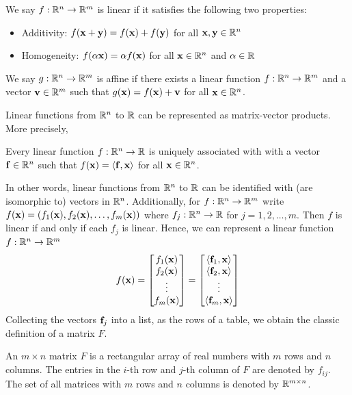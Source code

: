 \begin{definition}
We say $f: \mathbb{R}^n \to \mathbb{R}^m$ is linear if it satisfies the following two properties:
\begin{itemize}
    \item Additivity: $f(\mathbf{x} + \mathbf{y}) = f(\mathbf{x}) + f(\mathbf{y})$ for all $\mathbf{x}, \mathbf{y} \in \mathbb{R}^n$
    \item Homogeneity: $f(\alpha \mathbf{x}) = \alpha f(\mathbf{x})$ for all $\mathbf{x} \in \mathbb{R}^n$ and $\alpha \in \mathbb{R}$
\end{itemize}
We say $g: \mathbb{R}^n \to \mathbb{R}^m$ is affine if there exists a linear function $f: \mathbb{R}^n \to \mathbb{R}^m$ and a vector $\mathbf{v} \in \mathbb{R}^m$ such that $g(\mathbf{x}) = f(\mathbf{x}) + \mathbf{v}$ for all $\mathbf{x} \in \mathbb{R}^n$.
\end{definition}

Linear functions from $\mathbb{R}^n$ to $\mathbb{R}$ can be represented as matrix-vector products. More precisely, 
\begin{lemma}
Every linear function $f: \mathbb{R}^n \to \mathbb{R}$ is uniquely associated with 
   with a vector $\mathbf{f} \in \mathbb{R}^n$ such that $f(\mathbf{x}) = \langle \mathbf{f}, \mathbf{x} \rangle$ for all $\mathbf{x} \in \mathbb{R}^n$. 
\end{lemma}
In other words, linear functions from $\mathbb{R}^n$ to $\mathbb{R}$ can be identified with (are isomorphic to) vectors in $\mathbb{R}^n$. Additionally, for $f: \mathbb{R}^n \to \mathbb{R}^m$ write $f(\mathbf{x}) = (f_1(\mathbf{x}), f_2(\mathbf{x}), \ldots, f_m(\mathbf{x}))$ where $f_j: \mathbb{R}^n \to \mathbb{R}$ for $j=1,2,\ldots,m$. Then $f$ is linear if and only if each $f_j$ is linear. Hence, we can represent a linear function $f: \mathbb{R}^n \to \mathbb{R}^m$ 
\begin{equation*}
    f(\mathbf{x}) = \begin{bmatrix}
        f_1(\mathbf{x}) \\
        f_2(\mathbf{x}) \\
        \vdots \\
        f_m(\mathbf{x})
    \end{bmatrix} = 
    \begin{bmatrix}
        \langle \mathbf{f}_1, \mathbf{x} \rangle \\
        \langle \mathbf{f}_2, \mathbf{x} \rangle \\
        \vdots \\
        \langle \mathbf{f}_m, \mathbf{x} \rangle
    \end{bmatrix} 
\end{equation*}
Collecting the vectors $\mathbf{f}_j$ into a list, as the rows of a table, we obtain 
the classic definition of a matrix $F$. 
\begin{definition}
    An $m \times n$ matrix $F$ is a rectangular array of real numbers with $m$ rows and $n$ columns. The entries in the $i$-th row and $j$-th column of $F$ are denoted by $f_{ij}$. The set of all matrices with $m$ rows and $n$ columns is denoted by $\mathbb{R}^{m \times n}$.
\end{definition}

